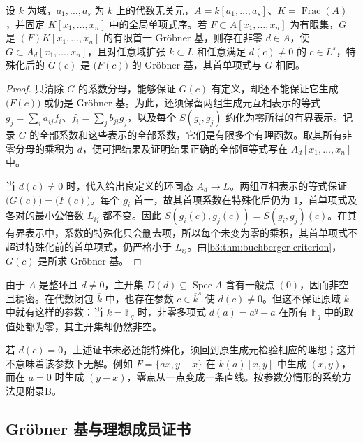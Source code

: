 \begin{proposition}\label{b3:prop:groebner-specialization-open}
	设 \(k\) 为域，\(a_1,\ldots,a_s\) 为 \(k\) 上的代数无关元，\(A=k[a_1,\ldots,a_s]\)、\(K=\operatorname{Frac}(A)\)，并固定 \(K[x_1,\ldots,x_n]\) 中的全局单项式序。若 \(F\subset A[x_1,\ldots,x_n]\) 为有限集，\(G\) 是 \((F)K[x_1,\ldots,x_n]\) 的有限首一 Gröbner 基，则存在非零 \(d\in A\)，使 \(G\subset A_d[x_1,\ldots,x_n]\)，且对任意域扩张 \(k\subset L\) 和任意满足 \(d(c)\ne0\) 的 \(c\in L^s\)，特殊化后的 \(G(c)\) 是 \(\bigl(F(c)\bigr)\) 的 Gröbner 基，其首单项式与 \(G\) 相同。
\end{proposition}
\begin{proof}
	只清除 \(G\) 的系数分母，能够保证 \(G(c)\) 有定义，却还不能保证它生成 \(\bigl(F(c)\bigr)\) 或仍是 Gröbner 基。为此，还须保留两组生成元互相表示的等式 \(g_j=\sum_i a_{ij}f_i\)、\(f_i=\sum_j b_{ji}g_j\)，以及每个 \(S(g_i,g_j)\) 约化为零所得的有界表示。记录 \(G\) 的全部系数和这些表示的全部系数，它们是有限多个有理函数。取其所有非零分母的乘积为 \(d\)，便可把结果及证明结果正确的全部恒等式写在 \(A_d[x_1,\ldots,x_n]\) 中。

	当 \(d(c)\ne0\) 时，代入给出良定义的环同态 \(A_d\to L\)。两组互相表示的等式保证 \(\bigl(G(c)\bigr)=\bigl(F(c)\bigr)\)。每个 \(g_i\) 首一，故其首项系数在特殊化后仍为 \(1\)，首单项式及各对的最小公倍数 \(L_{ij}\) 都不变。因此 \(S(g_i(c),g_j(c))=S(g_i,g_j)(c)\)。在其有界表示中，系数的特殊化只会删去项，所以每个未变为零的乘积，其首单项式不超过特殊化前的首单项式，仍严格小于 \(L_{ij}\)。由\cref{b3:thm:buchberger-criterion}，\(G(c)\) 是所求 Gröbner 基。
\end{proof}

由于 \(A\) 是整环且 \(d\ne0\)，主开集 \(D(d)\subseteq\operatorname{Spec}A\) 含有一般点 \((0)\)，因而非空且稠密。在代数闭包 \(\overline k\) 中，也存在参数 \(c\in\overline k^s\) 使 \(d(c)\ne0\)。但这不保证原域 \(k\) 中就有这样的参数：当 \(k=\mathbb F_q\) 时，非零多项式 \(d(a)=a^q-a\) 在所有 \(\mathbb F_q\) 中的取值处都为零，其主开集却仍然非空。

\ProseParagraphBreak
若 \(d(c)=0\)，上述证书未必还能特殊化，须回到原生成元检验相应的理想；这并不意味着该参数下无解。例如 \(F=\{ax,y-x\}\) 在 \(k(a)[x,y]\) 中生成 \((x,y)\)，而在 \(a=0\) 时生成 \((y-x)\)，零点从一点变成一条直线。按参数分情形的系统方法见附录B。

\subsection{Gröbner 基与理想成员证书}
\label{b3:subsec:0804:02}

